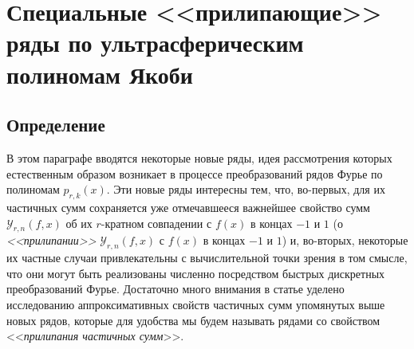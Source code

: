 \section{Специальные <<прилипающие>> ряды по ультрасферическим полиномам Якоби}
\subsection{Определение}
В этом параграфе вводятся некоторые новые ряды, идея рассмотрения которых естественным образом возникает в процессе  преобразований  рядов Фурье по полиномам $p_{r,k}(x)$. Эти новые ряды интересны тем, что, во-первых, для их частичных сумм сохраняется уже отмечавшееся   важнейшее свойство сумм  $\mathcal{Y}_{r,n}(f,x)$ об их $r$-кратном совпадении с $f(x)$ в концах $-1$ и $1$ (о \textit{<<прилипании>>} $\mathcal{Y}_{r,n}(f,x)$ с $f(x)$ в концах $-1$ и $1$) и, во-вторых, некоторые их частные случаи привлекательны с вычислительной точки зрения в том смысле, что они могут быть реализованы численно посредством быстрых дискретных преобразований Фурье.
Достаточно много внимания в статье уделено исследованию аппроксимативных свойств  частичных сумм упомянутых выше новых рядов, которые для удобства мы будем называть рядами со свойством <<\textit{прилипания частичных сумм}>>.

